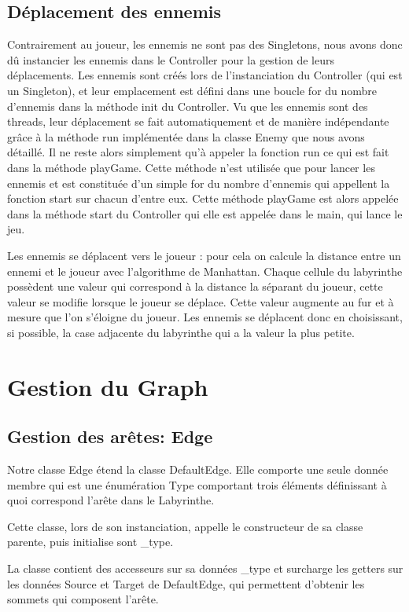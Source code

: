 \documentclass [10pt, a4paper]{article}
\begin{document}
\subsection {Déplacement des ennemis}
Contrairement au joueur, les ennemis ne sont pas des Singletons, nous avons donc dû instancier les ennemis dans le Controller pour la gestion de leurs déplacements. Les ennemis sont créés lors de l'instanciation du Controller (qui est un Singleton), et leur emplacement est défini dans une boucle for du nombre d'ennemis dans la méthode init du Controller. Vu que les ennemis sont des threads, leur déplacement se fait automatiquement et de manière indépendante grâce à la méthode run implémentée dans la classe Enemy que nous avons détaillé. Il ne reste alors simplement qu'à appeler la fonction run ce qui est fait dans la méthode playGame. Cette méthode n'est utilisée que pour lancer les ennemis et est constituée d'un simple for du nombre d'ennemis qui appellent la fonction start sur chacun d'entre eux. Cette méthode playGame est alors appelée dans la méthode start du Controller qui elle est appelée dans le main, qui lance le jeu.

Les ennemis se déplacent vers le joueur : pour cela on calcule la distance entre un ennemi et le joueur avec l'algorithme de Manhattan. Chaque cellule du labyrinthe possèdent une valeur qui correspond à la distance la séparant du joueur, cette valeur se modifie lorsque le joueur se déplace. Cette valeur augmente au fur et à mesure que l'on s'éloigne du joueur. Les ennemis se déplacent donc en choisissant, si possible, la case adjacente du labyrinthe qui a la valeur la plus petite.

\section {Gestion du Graph}
\subsection {Gestion des arêtes: Edge}
Notre classe Edge étend la classe DefaultEdge. Elle comporte une seule donnée membre qui est une énumération Type comportant trois éléments définissant à quoi correspond l'arête dans le Labyrinthe.

Cette classe, lors de son instanciation, appelle le constructeur de sa classe parente, puis initialise sont _type.

La classe contient des accesseurs sur sa données _type et surcharge les getters sur les données Source et Target de DefaultEdge, qui permettent d'obtenir les sommets qui composent l'arête.
\end{document}
